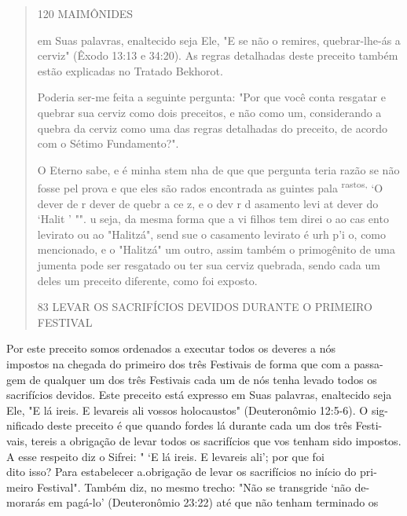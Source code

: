 \begin{quote}
120 MAIMÔNIDES

em Suas palavras, enaltecido seja Ele, "E se não o remires,
quebrar-lhe-ás a cer­viz" (Êxodo 13:13 e 34:20). As regras detalhadas
deste preceito também estão explicadas no Tratado Bekhorot.

Poderia ser-me feita a seguinte pergunta: "Por que você conta resga­tar
e quebrar sua cerviz como dois preceitos, e não como um, considerando a
quebra da cerviz como uma das regras detalhadas do preceito, de acordo
com o Sétimo Fundamento?".

O Eterno sabe, e é minha stem nha de que que pergunta teria razão se não
fosse pel prova e que eles são rados encontrada as guintes pala
\textsuperscript{rastos,} `O dever de r dever de quebr a ce z, e o dev r
d asamento levi at dever do `Halit ' "". u seja, da mesma forma que a vi
filhos tem direi o ao cas ento levirato ou ao "Halitzá", send sue o
casamen­to levirato é urh p'i o, como mencionado, e o "Halitzá" um
outro, assim também o primogênito de uma jumenta pode ser resgatado ou
ter sua cerviz quebrada, sendo cada um deles um preceito diferente, como
foi exposto.

83 LEVAR OS SACRIFÍCIOS DEVIDOS DURANTE O PRIMEIRO FESTIVAL
\end{quote}

Por este preceito somos ordenados a executar todos os deveres a nós\\
impostos na chegada do primeiro dos três Festivais de forma que com a
passa-\\
gem de qualquer um dos três Festivais cada um de nós tenha levado todos
os\\
sacrifícios devidos. Este preceito está expresso em Suas palavras,
enaltecido seja\\
Ele, "E lá ireis. E levareis ali vossos holocaustos" (Deuteronômio
12:5-6). O sig-\\
nificado deste preceito é que quando fordes lá durante cada um dos três
Festi-\\
vais, tereis a obrigação de levar todos os sacrifícios que vos tenham
sido impostos.\\
A esse respeito diz o Sifrei: " `E lá ireis. E levareis ali'; por que
foi\\
dito isso? Para estabelecer a.obrigação de levar os sacrifícios no
início do pri-\\
meiro Festival". Também diz, no mesmo trecho: "Não se transgride `não
de-\\
morarás em pagá-lo' (Deuteronômio 23:22) até que não tenham terminado os

